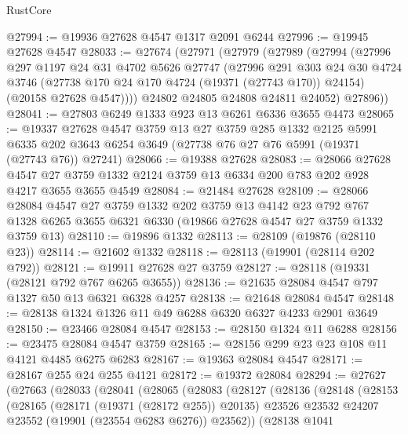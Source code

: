 \begin{lexlean}{RustCore}
\begin{coremodule}
@27994 := @19936 @27628 @4547 @1317 @2091 @6244
@27996 := @19945 @27628 @4547
@28033 := @27674
    (@27971
      (@27979
        (@27989
          (@27994
            (@27996
              @297
              @1197
              @24
              @31
              @4702
              @5626
              @27747
              (@27996
                @291
                @303
                @24
                @30
                @4724
                @3746
                (@27738 @170 @24 @170 @4724 (@19371 (@27743 @170)) @24154)
                (@20158 @27628 @4547))))
          @24802
          @24805
          @24808
          @24811
          @24052)
        @27896))
@28041 := @27803 @6249 @1333 @923 @13 @6261 @6336 @3655 @4473
@28065 := @19337
    @27628
    @4547
    @3759
    @13
    @27
    @3759
    @285
    @1332
    @2125
    @5991
    @6335
    @202
    @3643
    @6254
    @3649
    (@27738 @76 @27 @76 @5991 (@19371 (@27743 @76)) @27241)
@28066 := @19388 @27628
@28083 := @28066
    @27628
    @4547
    @27
    @3759
    @1332
    @2124
    @3759
    @13
    @6334
    @200
    @783
    @202
    @928
    @4217
    @3655
    @3655
    @4549
@28084 := @21484 @27628
@28109 := @28066
    @28084
    @4547
    @27
    @3759
    @1332
    @202
    @3759
    @13
    @4142
    @23
    @792
    @767
    @1328
    @6265
    @3655
    @6321
    @6330
    (@19866 @27628 @4547 @27 @3759 @1332 @3759 @13)
@28110 := @19896 @1332
@28113 := @28109 (@19876 (@28110 @23))
@28114 := @21602 @1332
@28118 := @28113 (@19901 (@28114 @202 @792))
@28121 := @19911 @27628 @27 @3759
@28127 := @28118 (@19331 (@28121 @792 @767 @6265 @3655))
@28136 := @21635 @28084 @4547 @797 @1327 @50 @13 @6321 @6328 @4257
@28138 := @21648 @28084 @4547
@28148 := @28138 @1324 @1326 @11 @49 @6288 @6320 @6327 @4233 @2901 @3649
@28150 := @23466 @28084 @4547
@28153 := @28150 @1324 @11 @6288
@28156 := @23475 @28084 @4547 @3759
@28165 := @28156 @299 @23 @23 @108 @11 @4121 @4485 @6275 @6283
@28167 := @19363 @28084 @4547
@28171 := @28167 @255 @24 @255 @4121
@28172 := @19372 @28084
@28294 := @27627
    (@27663
      (@28033
        (@28041
          (@28065
            (@28083
              (@28127
                (@28136
                  (@28148
                    (@28153
                      (@28165
                        (@28171 (@19371 (@28172 @255)) @20135)
                        @23526
                        @23532
                        @24207
                        @23552
                        (@19901 (@23554 @6283 @6276))
                        @23562))
                    (@28138
                      @1041

\end{coremodule}
\end{lexlean}
